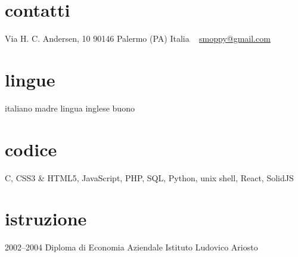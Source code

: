 \documentclass[]{friggeri-cv} %
\begin{document}


\begin{aside} %
\section{contatti}
Via H. C. Andersen, 10
90146 Palermo (PA)
Italia
~
\href{mailto:smoppy@gmail.com}{smoppy@gmail.com}
\section{lingue}
italiano madre lingua
inglese buono
\section{codice}
C, CSS3 \& HTML5, JavaScript, PHP, SQL, Python, unix shell, React, SolidJS
\end{aside}

\section{istruzione}
\begin{entrylist}
\entry
{2002--2004}
{Diploma {\normalfont di Economia Aziendale}}
{Istituto Ludovico Ariosto}
{}
\end{entrylist}

\end{document}
